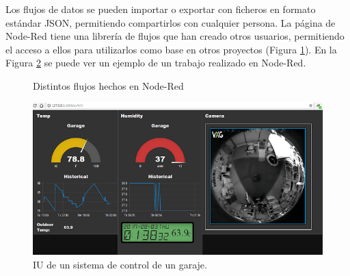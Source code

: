 Los flujos de datos se pueden importar o exportar con ficheros en formato estándar JSON, permitiendo compartirlos con cualquier persona. La página de Node-Red tiene una librería de flujos que han creado otros usuarios, permitiendo el acceso a ellos para utilizarlos como base en otros proyectos (Figura \ref{fig:flujos}). En la Figura \ref{fig:ui-internet} se puede ver un ejemplo de un trabajo realizado en Node-Red.\\
\begin{figure}[h!]
  \begin{center}
    \hspace{2mm}
  \end{center}
\caption{Distintos flujos hechos en Node-Red} \label{fig:flujos}
\end{figure}
\begin{figure} [h!]
  \begin{center}
    \includegraphics[width=15cm]{figs/ui-internet}
  \end{center}
  \caption{IU de un sistema de control de un garaje.}
  \label{fig:ui-internet}
\end{figure}

